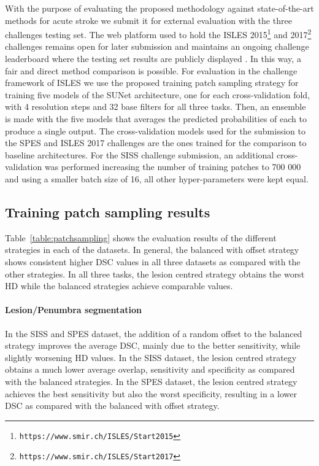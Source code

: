 \documentclass[letterpaper,final,authoryear,3p,times,twocolumn]{elsarticle}
\begin{document}
With the purpose of evaluating the proposed methodology against state-of-the-art methods for acute stroke we submit it for external evaluation with the three challenges testing set. The web platform used to hold the ISLES 2015\footnote{\texttt{https://www.smir.ch/ISLES/Start2015}} and 2017\footnote{\texttt{https://www.smir.ch/ISLES/Start2017}} challenges remains open for later submission and maintains an ongoing challenge leaderboard where the testing set results are publicly displayed \citep{Kistler2013, Maier2017isles}. In this way, a fair and direct method comparison is possible. For evaluation in the challenge framework of ISLES we use the proposed training patch sampling strategy for training five models of the SUNet architecture, one for each cross-validation fold, with 4 resolution steps and 32 base filters for all three tasks. Then, an ensemble is made with the five models that averages the predicted probabilities of each to produce a single output. The cross-validation models used for the submission to the SPES and ISLES 2017 challenges are the ones trained for the comparison to baseline architectures. For the SISS challenge submission, an additional cross-validation was performed increasing the number of training patches to 700 000 and using a smaller batch size of 16, all other hyper-parameters were kept equal.

\subsection{Training patch sampling results}
Table~\ref{table:patchsampling} shows the evaluation results of the different strategies in each of the datasets. In general, the balanced with offset strategy shows consistent higher DSC values in all three datasets as compared with the other strategies. In all three tasks, the lesion centred strategy obtains the worst HD while the balanced strategies achieve comparable values.

\paragraph{Lesion/Penumbra segmentation} In the SISS and SPES dataset, the addition of a random offset to the balanced strategy improves the average DSC, mainly due to the better sensitivity, while slightly worsening HD values. In the SISS dataset, the lesion centred strategy obtains a much lower average overlap, sensitivity and specificity as compared with the balanced strategies. In the SPES dataset, the lesion centred strategy achieves the best sensitivity but also the worst specificity, resulting in a lower DSC as compared with the balanced with offset strategy.
\end{document}
